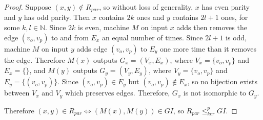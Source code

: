 \documentclass{article}
\theoremstyle{definition}
\newcommand{\kr}{\leq^{p}_{ker}} %
\begin{document}
\begin{proof}
  Suppose $(x, y)\notin R_{par}$, so without loss of generality, $x$ has even
  parity and $y$ has odd parity. Then $x$ contains $2k$ ones and $y$ contains
  $2l+1$ ones, for some $k,l\in\mathbb{N}$. Since $2k$ is even, machine $M$ on
  input $x$ adds then removes the edge $(v_o, v_p)$ to and from $E_x$ an equal
  number of times. Since $2l+1$ is odd, machine $M$ on input $y$ adds edge
  $(v_o, v_p)$ to $E_y$ one more time than it removes the edge. Therefore
  $M(x)$ outputs $G_x=(V_x, E_x)$, where $V_x=\{v_o, v_p\}$ and $E_x=\{\}$, and
  $M(y)$ outputs $G_y=(V_y, E_y)$, where $V_y=\{v_o, v_p\}$ and $E_y=\{(v_o,
  v_p)\}$. Since $(v_o, v_p)\in E_y$ but $(v_o, v_p)\notin E_x$, so no
  bijection exists between $V_x$ and $V_y$ which preserves edges. Therefore,
  $G_x$ is not isomorphic to $G_y$.

  Therefore $(x, y)\in R_{par} \iff (M(x), M(y)) \in GI$, so $R_{par} \kr GI$.
\end{proof}
\end{document}
